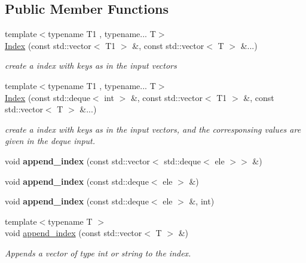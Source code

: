 \subsection*{Public Member Functions}
\begin{DoxyCompactItemize}
\item 
{\footnotesize template$<$typename T1 , typename... T$>$ }\\\hyperlink{classIndex_a35f4948aa1ed7b87dc285cd56a64d24c}{Index} (const std\+::vector$<$ T1 $>$ \&, const std\+::vector$<$ T $>$ \&...)
\begin{DoxyCompactList}\small\item\em create a index with keys as in the input vectors \end{DoxyCompactList}\item 
{\footnotesize template$<$typename T1 , typename... T$>$ }\\\hyperlink{classIndex_adc750ff9ab90e7fac9d411d1ebea4c86}{Index} (const std\+::deque$<$ int $>$ \&, const std\+::vector$<$ T1 $>$ \&, const std\+::vector$<$ T $>$ \&...)
\begin{DoxyCompactList}\small\item\em create a index with keys as in the input vectors, and the corresponsing values are given in the deque input. \end{DoxyCompactList}\item 
\mbox{\label{classIndex_ab7e3d65b24ab12baad98db7491b65c74}} 
void {\bfseries append\+\_\+index} (const std\+::vector$<$ std\+::deque$<$ ele $>$$>$ \&)
\item 
\mbox{\label{classIndex_a847fbc1e3793b8a56d6d28c57d6c48b7}} 
void {\bfseries append\+\_\+index} (const std\+::deque$<$ ele $>$ \&)
\item 
\mbox{\label{classIndex_a943238b23183e406b3aa087545c20d49}} 
void {\bfseries append\+\_\+index} (const std\+::deque$<$ ele $>$ \&, int)
\item 
\mbox{\label{classIndex_af2ba3a1d2da53657241e91ed79b0f3ff}} 
{\footnotesize template$<$typename T $>$ }\\void \hyperlink{classIndex_af2ba3a1d2da53657241e91ed79b0f3ff}{append\+\_\+index} (const std\+::vector$<$ T $>$ \&)
\begin{DoxyCompactList}\small\item\em Appends a vector of type int or string to the index. \end{DoxyCompactList}\item 
$$
\end{DoxyCompactItemize}
